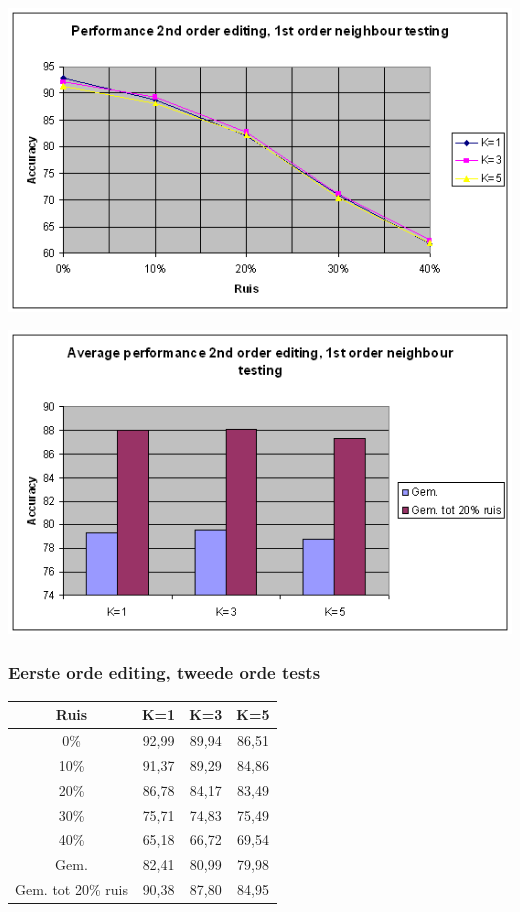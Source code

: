 \documentclass{article}
\begin{document}
\begin{center} \includegraphics[scale=0.7]{xor_2ndordedit_1stordtest_lijn} \end{center}
\begin{center} \includegraphics[scale=0.7]{xor_2ndordedit_1stordtest_staaf} \end{center}

\subsubsection{Eerste orde editing, tweede orde tests}

\begin{tabular}{|c|c|c|c|} \hline
Ruis &	K=1 &	K=3 &	K=5 \\ \hline
0\% &	92,99 &	89,94 &	86,51 \\
10\%	 & 91,37 & 	89,29 &	84,86 \\
20\%	 & 86,78 & 	84,17 &	83,49 \\
30\%	& 75,71 & 	74,83 &	75,49 \\
40\% & 65,18	& 66,72 &	69,54 \\
Gem.	& 82,41	& 80,99 &	79,98 \\
Gem. tot 20\% ruis &	90,38 &	87,80 &	84,95 \\ \hline
\end{tabular} \\
\end{document}
